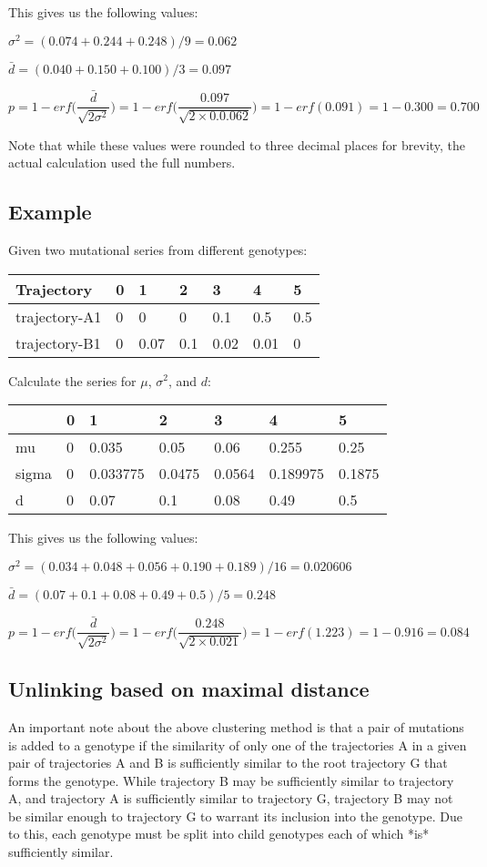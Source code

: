 \documentclass{report}
\begin{document}
This gives us the following values:

$\sigma^2=(0.074+0.244+0.248)/9=0.062$

$\bar{d}=(0.040+0.150+0.100)/3=0.097$

$$
p = 1 - erf \bigg(\frac{\bar{d}}{\sqrt{2\sigma^2}}\bigg)=
1-erf \bigg(\frac{0.097}{\sqrt{2 \times 0.0.062}}\bigg)=
1-erf(0.091)=1-0.300=0.700
$$

Note that while these values were rounded to three decimal places for brevity, the actual calculation used the full numbers.

\subsection{Example}
Given two mutational series from different genotypes:
\begin{tabular}{l|llllll}
  Trajectory & 0 & 1 & 2 & 3 & 4 & 5 \\
\hline
 trajectory-A1 & 0 & 0    & 0   & 0.1  & 0.5  & 0.5 \\
 trajectory-B1 & 0 & 0.07 & 0.1 & 0.02 & 0.01 & 0   \\
\end{tabular}

Calculate the series for $\mu$, $\sigma^2$, and $d$:
\begin{tabular}{l|llllll}
  & 0 & 1 & 2 & 3 & 4 & 5 \\
\hline 
 mu         & 0 & 0.035    & 0.05   & 0.06   & 0.255    & 0.25   \\
 sigma      & 0 & 0.033775 & 0.0475 & 0.0564 & 0.189975 & 0.1875 \\
 d          & 0 & 0.07     & 0.1    & 0.08   & 0.49     & 0.5    \\
\end{tabular}
This gives us the following values:

$\sigma^2=(0.034+0.048+0.056+0.190+0.189)/16=0.020606$

$\bar{d}=(0.07+0.1+0.08+0.49+0.5)/5=0.248$

$$
p = 1 - erf \bigg(\frac{\bar{d}}{\sqrt{2\sigma^2}}\bigg)=
1-erf \bigg(\frac{0.248}{\sqrt{2 \times 0.021}}\bigg)=
1-erf(1.223)=1-0.916=0.084
$$


\subsection{Unlinking based on maximal distance}

An important note about the above clustering method is that a pair of mutations is added to a genotype if the similarity of only one of the trajectories A in a given pair of trajectories A and B is sufficiently similar to the root trajectory G that forms the genotype. While trajectory B may be sufficiently similar to trajectory A, and trajectory A is sufficiently similar to trajectory G, trajectory B may not be similar enough to trajectory G to warrant its inclusion into the genotype. Due to this, each genotype must be split into child genotypes each of which *is* sufficiently similar.
\end{document}
